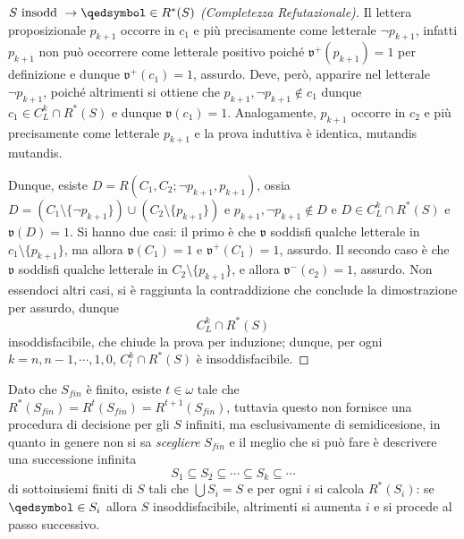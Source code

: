 \begin{proof}[$S \text{ insodd } \rightarrow \qedsymbol \in R^*(S)$ (Completezza Refutazionale)]
        Il lettera proposizionale $p_{k+1}$ occorre in $c_1$ e più precisamente come 
        letterale $\neg p_{k+1}$, infatti $p_{k+1}$ non può occorrere come letterale 
        positivo poiché $\mathfrak{v}^+(p_{k+1}) =1$ per definizione e dunque $ \mathfrak{v}^+(c_1) = 1$, 
        assurdo. Deve, però, apparire nel letterale $\neg p_{k+1}$, poiché altrimenti 
        si ottiene che $p_{k+1}, \neg p_{k+1} \notin c_1$ dunque $c_1 \in C^k_L \cap R^*(S)$ 
        e dunque $\mathfrak{v}(c_1) = 1$. Analogamente, 
        $p_{k+1}$ occorre in $c_2$ e più precisamente come letterale $p_{k+1}$ 
        e la prova induttiva è identica, mutandis mutandis. 


        Dunque, esiste $D = R(C_1, C_2; \neg p_{k+1}, p_{k+1})$, ossia 
        $D = (C_1 \setminus \{ \neg p_{k+1}\}) \cup (C_2 \setminus \{p_{k+1}\})$ 
        e $p_{k+1}, \neg p_{k+1} \notin D$ e $D \in C^{k}_L \cap R^*(S)$ 
        e $\mathfrak{v}(D) = 1$. Si hanno due casi: il primo è che 
        $\mathfrak{v}$ soddisfi qualche letterale in $c_1 \setminus \{p_{k+1}\}$, 
        ma allora $\mathfrak{v}(C_1)  = 1$ e $\mathfrak{v}^+(C_1) = 1$, 
        assurdo.
        Il secondo caso è che $\mathfrak{v}$ soddisfi qualche letterale 
        in $C_2 \setminus \{p_{k+1}\}$, e allora $\mathfrak{v}^-(c_2) = 1$, 
        assurdo.
        Non essendoci altri casi, si è raggiunta la contraddizione 
        che conclude la dimostrazione per assurdo, dunque 
        $$
                C^k_L \cap R^*(S)
        $$
        insoddisfacibile, che chiude la prova per induzione; dunque, 
        per ogni $k = n, n-1, \cdots, 1, 0$, $C^k_l \cap R^*(S)$ è 
        insoddisfacibile.
\end{proof}
\begin{oss}
        Dato che $S_{fin}$ è finito, esiste $t \in \omega$ tale 
        che $R^*(S_{fin})=R^t(S_{fin}) = R^{t+1}(S_{fin})$, 
        tuttavia questo non fornisce una procedura di decisione per 
        gli $S$ infiniti, ma esclusivamente di semidicesione, in quanto 
        in genere non si sa \textit{scegliere} $S_{fin}$ e 
        il meglio che si può fare è descrivere una successione infinita 
        $$
        S_1 \subseteq S_2 \subseteq \cdots \subseteq S_k  \subseteq \cdots 
        $$
        di sottoinsiemi finiti di $S$ tali che $\bigcup S_i = S$ e 
        per ogni $i$ si calcola $R^*(S_i)$: se $\qedsymbol \in S_i$ allora 
        $S$ insoddisfacibile, 
        altrimenti si aumenta $i$ e si procede al passo successivo.
\end{oss}

